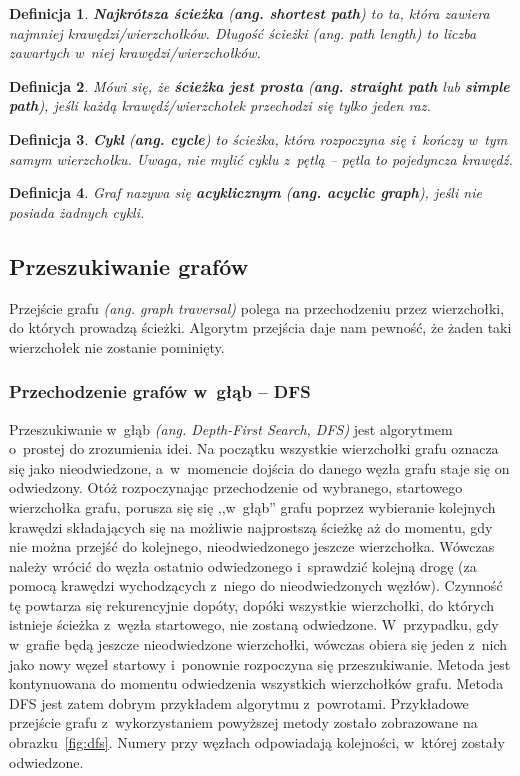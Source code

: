 \documentclass[twoside,12pt]{report}
\newtheorem{definition}{Definicja} %
\begin{document}
\begin{definition}
\textbf{Najkrótsza ścieżka} (\textbf{ang. shortest path}) to ta, która zawiera najmniej krawędzi/wierzchołków. Długość ścieżki (\textit{ang. path length}) to liczba zawartych w~niej krawędzi/wierzchołków.
\end{definition}

\begin{definition}
Mówi się, że \textbf{ścieżka jest prosta} (\textbf{ang. straight path} lub \textbf{simple path}), jeśli każdą krawędź/wierzchołek przechodzi się tylko jeden raz.
\end{definition}

\begin{definition}
\textbf{Cykl} (\textbf{ang. cycle}) to ścieżka, która rozpoczyna się i~kończy w~tym samym wierzchołku. Uwaga, nie mylić cyklu z~pętlą – pętla to pojedyncza krawędź.
\end{definition}

\begin{definition}
Graf nazywa się \textbf{acyklicznym} (\textbf{ang. acyclic graph}), jeśli nie posiada żadnych cykli.
\end{definition}

\subsection{Przeszukiwanie grafów}\label{sec:przeszukiwanie_grafow}
Przejście grafu \textit{(ang. graph traversal)} polega na przechodzeniu przez wierzchołki, do których prowadzą ścieżki. Algorytm przejścia daje nam pewność, że żaden taki wierzchołek nie zostanie pominięty.

\subsubsection{Przechodzenie grafów w~głąb – DFS}
Przeszukiwanie w~głąb \textit{(ang. Depth-First Search, DFS)} jest algorytmem o~prostej do zrozumienia idei. Na początku wszystkie wierzchołki grafu oznacza się jako nieodwiedzone, a~w~momencie dojścia do danego węzła grafu staje się on odwiedzony. Otóż rozpoczynając przechodzenie od wybranego, startowego wierzchołka grafu, porusza się się ,,w~głąb'' grafu poprzez wybieranie kolejnych krawędzi składających się na możliwie najprostszą ścieżkę aż do momentu, gdy nie można przejść do kolejnego, nieodwiedzonego jeszcze wierzchołka. Wówczas należy wrócić do węzła ostatnio odwiedzonego i~sprawdzić kolejną drogę (za pomocą krawędzi wychodzących z~niego do nieodwiedzonych węzłów). Czynność tę powtarza się rekurencyjnie dopóty, dopóki wszystkie wierzchołki, do których istnieje ścieżka z~węzła startowego, nie zostaną odwiedzone. W~przypadku, gdy w~grafie będą jeszcze nieodwiedzone wierzchołki, wówczas obiera się jeden z~nich jako nowy węzeł startowy i~ponownie rozpoczyna się przeszukiwanie. Metoda jest kontynuowana do momentu odwiedzenia wszystkich wierzchołków grafu. Metoda DFS jest zatem dobrym przykładem algorytmu z~powrotami. Przykładowe przejście grafu z~wykorzystaniem powyższej metody zostało zobrazowane na obrazku~\ref{fig:dfs}. Numery przy węzłach odpowiadają kolejności, w~której zostały odwiedzone.
\end{document}
